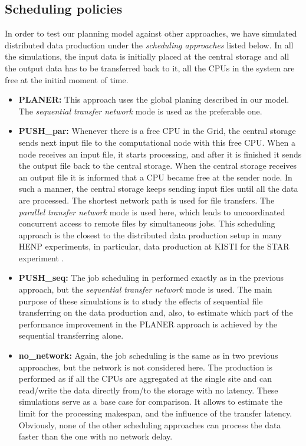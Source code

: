 \documentclass{svjour3}                     %
\begin{document}
\subsection{Scheduling policies}
In order to test our planning model against other approaches, we have simulated distributed data production under the \textit{scheduling approaches} listed below. In all the simulations, the input data is initially placed at the central storage and all the output data has to be transferred back to it, all the CPUs in the system are free at the initial moment of time.
\begin{itemize}
\label{scenarios}
\item \textbf{PLANER:}  This approach uses the global planing described in our model. The \textit{sequential transfer network} mode is used as the preferable one. 
\item \textbf{PUSH\_par:} Whenever there is a free CPU in the Grid, the central storage sends next input file to the computational node with this free CPU. When a node receives an input file, it starts processing, and after it is finished it sends the output file back to the central storage. When the central storage receives an output file it is informed that a CPU became free at the sender node. In such a manner, the central storage keeps sending input files until all the data are processed. The shortest network path is used for file transfers. The \textit{parallel transfer network} mode is used here, which leads to uncoordinated concurrent access to remote files by simultaneous jobs. This scheduling approach is the closest to the distributed data production setup in many HENP experiments, in particular, data production at KISTI for the STAR experiment \cite{KISTI-production}. 
\item \textbf{PUSH\_seq:} The job scheduling in performed exactly as in the previous approach, but the \textit{sequential transfer network} mode is used. The main purpose of these simulations is to study the effects of sequential file transferring on the data production and, also, to estimate which part of the performance improvement in the PLANER approach is achieved by the sequential transferring alone.
\item \textbf{no\_network:} Again, the job scheduling is the same as in two previous approaches, but the network is not considered here. The production is performed as if all the CPUs are aggregated at the single site and can read/write the data directly from/to the storage with no latency. These simulations serve as a base case for comparison. It allows to estimate the limit for the processing makespan, and the influence of the transfer latency. Obviously, none of the other scheduling approaches can process the data faster than the one with no network delay.
\end{itemize}
\end{document}

